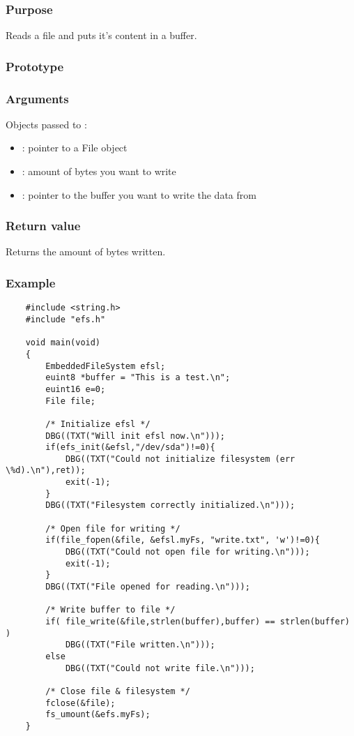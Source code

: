 \subsubsection*{Purpose}
Reads a file and puts it's content in a buffer.
\subsubsection*{Prototype}
\subsubsection*{Arguments}
Objects passed to :
\begin{itemize}
	\item{: pointer to a File object}
	\item{: amount of bytes you want to write}
	\item{: pointer to the buffer you want to write the data from}
\end{itemize}
\subsubsection*{Return value}
Returns the amount of bytes written.
\subsubsection*{Example}
\lstset{numbers=left, stepnumber=1, numberstyle=\small, numbersep=5pt, tabsize=4}
\begin{lstlisting}
	#include <string.h>
	#include "efs.h"

	void main(void)
	{
		EmbeddedFileSystem efsl;
		euint8 *buffer = "This is a test.\n";
		euint16 e=0;
		File file;

		/* Initialize efsl */
		DBG((TXT("Will init efsl now.\n")));
		if(efs_init(&efsl,"/dev/sda")!=0){
			DBG((TXT("Could not initialize filesystem (err \%d).\n"),ret));
			exit(-1);
		}
		DBG((TXT("Filesystem correctly initialized.\n")));

		/* Open file for writing */
		if(file_fopen(&file, &efsl.myFs, "write.txt", 'w')!=0){
			DBG((TXT("Could not open file for writing.\n")));
			exit(-1);
		}
		DBG((TXT("File opened for reading.\n")));

		/* Write buffer to file */
		if( file_write(&file,strlen(buffer),buffer) == strlen(buffer) )
			DBG((TXT("File written.\n")));
		else
			DBG((TXT("Could not write file.\n")));

		/* Close file & filesystem */
		fclose(&file);
		fs_umount(&efs.myFs);
	}
\end{lstlisting}
